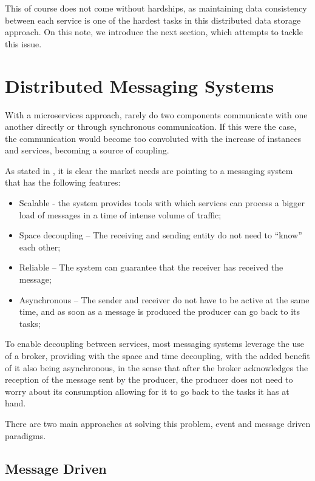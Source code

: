 This of course does not come without hardships, as maintaining data consistency between each service is one of the hardest tasks in this distributed data storage approach. On this note, we introduce the next section, which attempts to tackle this issue.


\section{Distributed Messaging Systems}\label{sec:DMS}

With a microservices approach, rarely do two components communicate with one another directly or through synchronous communication. If this were the case, the communication would become too convoluted with the increase of instances and services, becoming a source of coupling. 

As stated in \cite{sharvari2019study}, it is clear the market needs are pointing to a messaging system that has the following features:
\begin{itemize}
    \item Scalable - the system provides tools with which services can process a bigger load of messages in a time of intense volume of traffic;
    \item Space decoupling – The receiving and sending entity do not need to “know” each other;
    \item Reliable – The system can guarantee that the receiver has received the message;
    \item Asynchronous  – The sender and receiver do not have to be active at the same time, and as soon as a message is produced the producer can go back to its tasks;
\end{itemize}


To enable decoupling between services, most messaging systems leverage the use of a broker, providing with the space and time decoupling, with the added benefit of it also being asynchronous, in the sense that after the broker acknowledges the reception of the message sent by the producer, the producer does not need to worry about its consumption allowing for it to go back to the tasks it has at hand. 

There are two main approaches at solving this problem, event and message driven paradigms.

\subsection{Message Driven}


